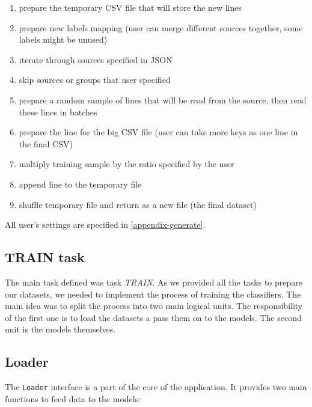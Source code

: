 \begin{enumerate}

\item prepare the temporary CSV file that will store the new lines

\item prepare new labels mapping (user can merge different sources together, some labels might be unused)

\item iterate through sources specified in JSON

\item skip sources or groups that user specified

\item prepare a random sample of lines that will be read from the source, then read these lines in batches

\item prepare the line for the big CSV file (user can take more keys as one line in the final CSV)

\item multiply training sample by the ratio specified by the user

\item append line to the temporary file

\item shuffle temporary file and return as a new file (the final dataset)

\end{enumerate}

\noindent
All user's settings are specified in \autoref{appendix-generate}.

\subsection{TRAIN task}

The main task defined was task \textit{TRAIN}. As we provided all the tasks to prepare our datasets, we needed to implement the process of training the classifiers. The main idea was to split the process into two main logical units. The responsibility of the first one is to load the datasets a pass them on to the models. The second unit is the models themselves.

\subsection*{Loader}

The \texttt{Loader} interface is a part of the core of the application. It provides two main functions to feed data to the models:

